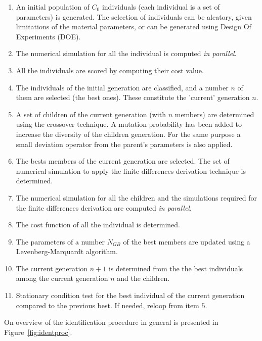 \begin{enumerate}
\item An initial population of $C_0$ individuals (each individual is a set of parameters) is generated. The selection of individuals can be aleatory, given limitations of the material parameters, or can be generated using Design Of Experiments (DOE).
\item The numerical simulation for all the individual is computed {\it in parallel}.
\item All the individuals are scored by computing their cost value.
\item The individuals of the initial generation are classified, and a number $n$ of them are selected (the best ones). These constitute the 'current' generation $n$.
\item	A set of children of the current generation (with $n$ members) are determined using the crossover technique. A mutation probability has been added to increase the diversity of the children generation. For the same purpose a small deviation operator from the parent's parameters is also applied.
\item The bests members of the current generation are selected. The set of numerical simulation to apply the finite differences derivation technique is determined.
\item The numerical simulation for all the children and the simulations required for the finite differences derivation are computed {\it in parallel}.
\item The cost function of all the individual is determined.
\item The parameters of a number $N_{GB}$ of the best members are updated using a Levenberg-Marquardt algorithm.
\item The current generation $n+1$ is determined from the the best individuals among the current generation $n$ and the children.
\item Stationary condition test for the best individual of the current generation compared to the previous best. If needed, reloop from item $5$.
\end{enumerate}

On overview of the identification procedure in general is presented in Figure~\ref{fig:identproc}.


